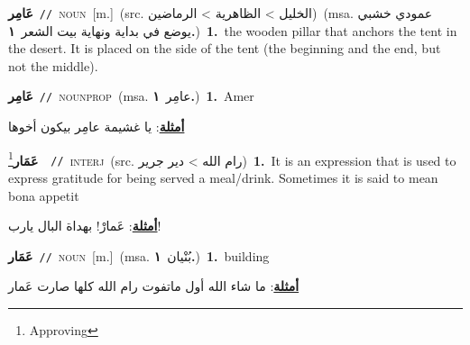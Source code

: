 \documentclass[10pt,a4paper,twoside]{article} %
\begin{document}
\begin{multicols}{2}
{\setlength\topsep{0pt}\textbf{\foreignlanguage{arabic}{عَامِر}}\ {\color{gray}\texttt{//}\color{black}}\ \textsc{noun}\ [m.]\ (src. \color{gray}\foreignlanguage{arabic}{الخليل > الظاهرية > الرماضين}\color{black})\ \color{gray}(msa. \foreignlanguage{arabic}{عمودي خشبي يوضع في بداية ونهاية بيت الشعر}~\foreignlanguage{arabic}{\textbf{١.}})\color{black}\ \textbf{1.}~the wooden pillar that anchors the tent in the desert. It is placed on the side of the tent (the beginning and the end, but not the middle).\ } \vspace{2mm}

{\setlength\topsep{0pt}\textbf{\foreignlanguage{arabic}{عَامِر}}\ {\color{gray}\texttt{//}\color{black}}\ \textsc{noun\textunderscore prop}\ \color{gray}(msa. \foreignlanguage{arabic}{عامِر}~\foreignlanguage{arabic}{\textbf{١.}})\color{black}\ \textbf{1.}~Amer\  \begin{flushright}\color{gray}\foreignlanguage{arabic}{\textbf{\underline{\foreignlanguage{arabic}{أمثلة}}}: يا غشيمة عامِر بيكون أخوها}\end{flushright}\color{black}} \vspace{2mm}

{\setlength\topsep{0pt}\textbf{\foreignlanguage{arabic}{عَمَار}}\footnote{Approving}\ \ {\color{gray}\texttt{//}\color{black}}\ \textsc{interj}\ (src. \color{gray}\foreignlanguage{arabic}{رام الله > دير جرير}\color{black})\ \textbf{1.}~It is an expression that is used to express gratitude for being served a meal/drink. Sometimes it is said to mean bona appetit\  \begin{flushright}\color{gray}\foreignlanguage{arabic}{\textbf{\underline{\foreignlanguage{arabic}{أمثلة}}}: عَمارْ! بهداة البال يارب!}\end{flushright}\color{black}} \vspace{2mm}

{\setlength\topsep{0pt}\textbf{\foreignlanguage{arabic}{عَمَار}}\ {\color{gray}\texttt{//}\color{black}}\ \textsc{noun}\ [m.]\ \color{gray}(msa. \foreignlanguage{arabic}{بُنْيان}~\foreignlanguage{arabic}{\textbf{١.}})\color{black}\ \textbf{1.}~building\  \begin{flushright}\color{gray}\foreignlanguage{arabic}{\textbf{\underline{\foreignlanguage{arabic}{أمثلة}}}: ما شاء الله أول ماتفوت رام الله كلها صارت عَمار}\end{flushright}\color{black}} \vspace{2mm}


\end{multicols}
\end{document}
